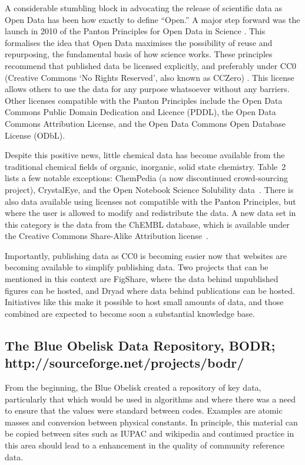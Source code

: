 \documentclass[10pt]{bmc_article}
\newenvironment{bmcformat}{\fussy\setboolean{publ}{true}}{\fussy}
\begin{document}
\begin{bmcformat}
A considerable stumbling block in advocating the release of scientific
data as Open Data has been how exactly to define ``Open.'' A major step
forward was the launch in 2010 of the Panton Principles for Open Data
in Science \cite{WebPanton}. This formalises the idea that Open Data maximises the
possibility of reuse and repurposing, the fundamental basis
of how science works. These principles recommend that published data
be licensed explicitly, and preferably under CC0 (Creative Commons `No
Rights Reserved', also known as CCZero) \cite{WebCC0}. This license allows others to use the
data for any purpose whatsoever without any barriers. Other licenses
compatible with the Panton Principles include the
Open Data Commons Public Domain Dedication and Licence (PDDL), the
Open Data Commons Attribution License, and the
Open Data Commons Open Database License (ODbL).\cite{WebOpenData}

Despite this positive news, little chemical data has become
available from the traditional chemical fields of organic,
inorganic, solid state chemistry. Table~2 lists a few notable
exceptions: ChemPedia (a now discontinued crowd-sourcing project),
CrystalEye,\cite{WebCrystalEye}
and the Open Notebook Science Solubility
data~\cite{ONS2010}. There is also data available using licenses
not compatible with the Panton Principles, but where the user
is allowed to modify and redistribute the data. A new data
set in this category is the data from the ChEMBL database,
which is available under the Creative Commons Share-Alike
Attribution license~\cite{Overington2009}.

Importantly, publishing data as CC0 is becoming easier now that
websites are becoming available to simplify publishing data. Two
projects that can be mentioned in this context are
FigShare\cite{WebFigShare}, where the data behind unpublished figures
can be hosted, and Dryad\cite{WebDryad} where data behind publications
can be hosted. Initiatives like this make it possible to host small
amounts of data, and those combined are expected to become soon a
substantial knowledge base. 

\subsection*{The Blue Obelisk Data Repository, BODR;
http://sourceforge.net/projects/bodr/}

From the beginning, the Blue Obelisk created a repository of key data,
particularly that which would be used in
algorithms and where there was a need to ensure that the values were
standard between codes. Examples are atomic
masses and conversion between physical constants. In principle, this
material can be copied between sites such as IUPAC and
wikipedia and continued practice in this area should lead to a
enhancement in the quality of community reference data.


\end{bmcformat}
\end{document}
